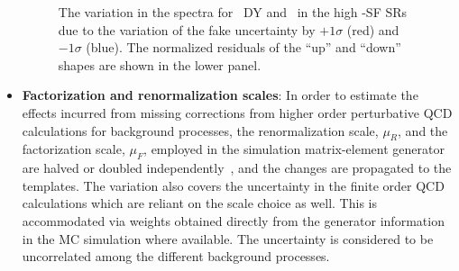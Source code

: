 \begin{itemize}
    \begin{figure}[h]
      \centering
      \caption{The variation in the \ptmiss spectra for~\protect{} DY and~\protect{} \ttll in the high \mttll-SF SRs due to the variation of the fake \ptmiss uncertainty by $+1\sigma$ (red) and $-1\sigma$ (blue). The normalized residuals of the ``up'' and ``down'' shapes are shown in the lower panel.}
      \label{fig:fakeMETshape}
    \end{figure}

\item \textbf{Factorization and renormalization scales}:
In order to estimate the effects incurred from missing corrections from higher order perturbative QCD calculations for background processes, the renormalization scale, $\mu_R$, and the factorization scale, $\mu_F$, employed in the simulation matrix-element generator are halved or doubled independently~\cite{Collins:1989gx}, and the changes are propagated to the \ptmiss templates. The variation also covers the uncertainty in the finite order QCD calculations which are reliant on the scale choice as well. This is accommodated via weights obtained directly from the generator information in the MC simulation where available. The uncertainty is considered to be uncorrelated among the different background processes. 


\end{itemize}
